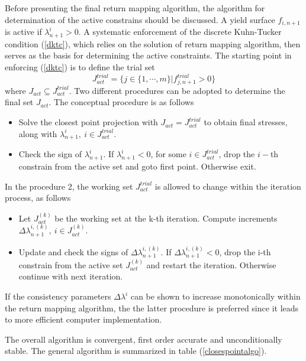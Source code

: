 \documentclass[epsf,a4paper]{article}
\begin{document}
Before presenting the final return mapping algorithm, the algorithm for determination of the active constrains should be discussed. A yield surface $f_{i,n+1}$ is active if $\lambda^i_{n+1} > 0$. A systematic enforcement of the discrete Kuhn-Tucker condition (\ref{dktc}), which relies on the solution of return mapping algorithm, then serves as the basis for determining the active constraints. The starting point in enforcing (\ref{dktc}) is to define the trial set
\begin{equation}
  J^{trial}_{act}=\{j\in\{1,\cdots,m\}|f^{trial}_{j,n+1} > 0\}
\end{equation}
where $J_{act}\subseteq J_{act}^{trial}$. Two different procedures can be adopted to determine the final set $J_{act}$. The conceptual procedure is as follows
\begin{itemize}
 \item
 Solve the closest point projection with $J_{act}=J_{act}^{trial}$ to obtain final stresses, along with $\lambda^i_{n+1},\ i\in J_{act}^{trial}$.
\item
Check the sign of $\lambda^i_{n+1}$. If $\lambda^i_{n+1} <0$, for some $i\in J_{act}^{trial}$, drop the $i-$th constrain from the active set and goto first point. Otherwise exit.
\end{itemize}

In the procedure 2, the working set $J_{act}^{trial}$ is allowed to change within the iteration process, as follows
\begin{itemize}
\item
Let $J_{act}^{(k)}$ be the working set at the k-th iteration. Compute increments $\Delta\lambda^{i,(k)}_{n+1},\ i\in J_{act}^{(k)}$.
\item
Update and check the signs of $\Delta\lambda^{i,(k)}_{n+1}$. If $\Delta\lambda^{i,(k)}_{n+1} < 0$, drop the i-th constrain from the active set $J_{act}^{(k)}$ and restart the iteration. Otherwise continue with next iteration.
\end{itemize}
If the consistency parameters $\Delta\lambda^{i}$ can be shown to increase monotonically within the return mapping algorithm, the the latter procedure is preferred since it leads to more efficient computer implementation. 

The overall algorithm is convergent, first order accurate and unconditionally stable. 
The general algorithm is summarized in table (\ref{closespointalgo}).
\end{document}
